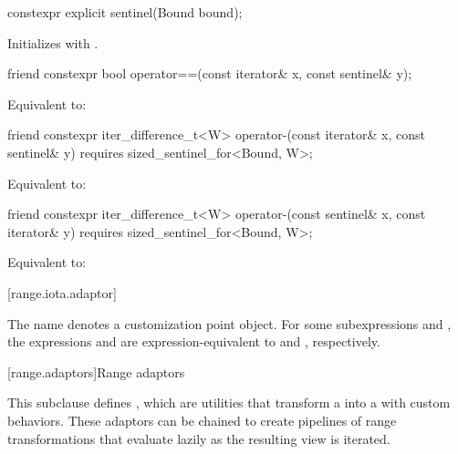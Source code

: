 \begin{itemdecl}
constexpr explicit sentinel(Bound bound);
\end{itemdecl}

\begin{itemdescr}
\pnum
\effects
Initializes  with .
\end{itemdescr}

\begin{itemdecl}
friend constexpr bool operator==(const iterator& x, const sentinel& y);
\end{itemdecl}

\begin{itemdescr}
\pnum
\effects
Equivalent to: 
\end{itemdescr}

\begin{itemdecl}
friend constexpr iter_difference_t<W> operator-(const iterator& x, const sentinel& y)
  requires sized_sentinel_for<Bound, W>;
\end{itemdecl}

\begin{itemdescr}
\pnum
\effects
Equivalent to: 
\end{itemdescr}

\begin{itemdecl}
friend constexpr iter_difference_t<W> operator-(const sentinel& x, const iterator& y)
  requires sized_sentinel_for<Bound, W>;
\end{itemdecl}

\begin{itemdescr}
\pnum
\effects
Equivalent to: 
\end{itemdescr}

[range.iota.adaptor]{}

\pnum
The name  denotes a
customization point object.
For some subexpressions  and , the expressions
 and 
are expression-equivalent to
 and , respectively.

[range.adaptors]{Range adaptors}

\pnum
This subclause defines , which are utilities that transform a
 into a  with custom behaviors. These
adaptors can be chained to create pipelines of range transformations that
evaluate lazily as the resulting view is iterated.

